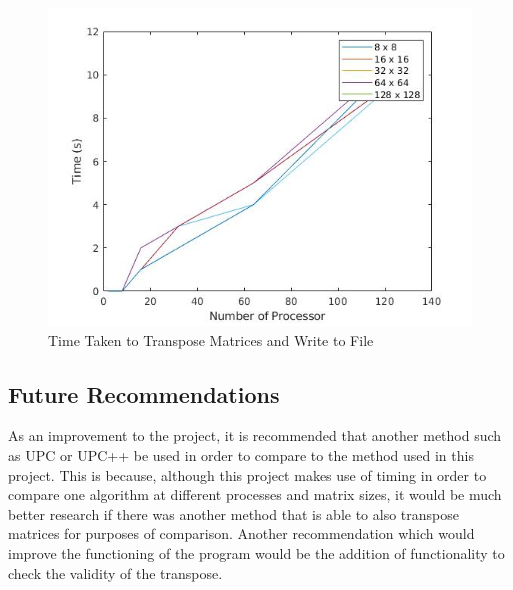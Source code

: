 \documentclass[11pt,conference]{IEEEtran}
\begin{document}
\begin{figure}[h!]
    \centering
    \includegraphics[scale=0.5]{report/out.jpg}
    \caption{Time Taken to Transpose Matrices and Write to File}
    \label{7}
\end{figure}




\subsection{Future Recommendations}
\noindent
As an improvement to the project, it is recommended that another method such as UPC or UPC++ be used in order to compare to the method used in this project. This is because, although this project makes use of timing in order to compare one algorithm at different processes and matrix sizes, it would be much better research if there was another method that is able to also transpose matrices for purposes of comparison. Another recommendation which would improve the functioning of the program would be the addition of functionality to check the validity of the transpose.
\end{document}
